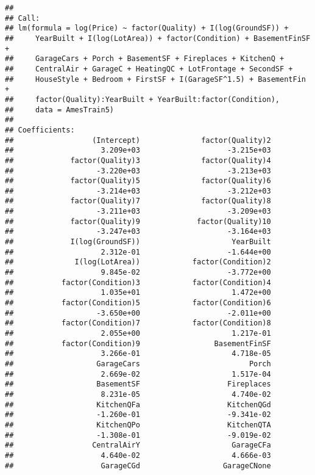 \documentclass[
]{article}
\begin{document}
\begin{verbatim}
## 
## Call:
## lm(formula = log(Price) ~ factor(Quality) + I(log(GroundSF)) + 
##     YearBuilt + I(log(LotArea)) + factor(Condition) + BasementFinSF + 
##     GarageCars + Porch + BasementSF + Fireplaces + KitchenQ + 
##     CentralAir + GarageC + HeatingQC + LotFrontage + SecondSF + 
##     HouseStyle + Bedroom + FirstSF + I(GarageSF^1.5) + BasementFin + 
##     factor(Quality):YearBuilt + YearBuilt:factor(Condition), 
##     data = AmesTrain5)
## 
## Coefficients:
##                  (Intercept)              factor(Quality)2  
##                    3.209e+03                    -3.215e+03  
##             factor(Quality)3              factor(Quality)4  
##                   -3.220e+03                    -3.213e+03  
##             factor(Quality)5              factor(Quality)6  
##                   -3.214e+03                    -3.212e+03  
##             factor(Quality)7              factor(Quality)8  
##                   -3.211e+03                    -3.209e+03  
##             factor(Quality)9             factor(Quality)10  
##                   -3.247e+03                    -3.164e+03  
##             I(log(GroundSF))                     YearBuilt  
##                    2.312e-01                    -1.644e+00  
##              I(log(LotArea))            factor(Condition)2  
##                    9.845e-02                    -3.772e+00  
##           factor(Condition)3            factor(Condition)4  
##                    1.035e+01                     1.472e+00  
##           factor(Condition)5            factor(Condition)6  
##                   -3.650e+00                    -2.011e+00  
##           factor(Condition)7            factor(Condition)8  
##                    2.055e+00                     1.217e-01  
##           factor(Condition)9                 BasementFinSF  
##                    3.266e-01                     4.718e-05  
##                   GarageCars                         Porch  
##                    2.669e-02                     1.517e-04  
##                   BasementSF                    Fireplaces  
##                    8.231e-05                     4.740e-02  
##                   KitchenQFa                    KitchenQGd  
##                   -1.260e-01                    -9.341e-02  
##                   KitchenQPo                    KitchenQTA  
##                   -1.308e-01                    -9.019e-02  
##                  CentralAirY                     GarageCFa  
##                    4.640e-02                     4.666e-03  
##                    GarageCGd                   GarageCNone  

\end{verbatim}
\end{document}
